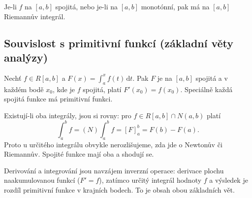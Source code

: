 \documentclass[11pt,a4paper]{article}
\begin{document}
\begin{center}
\end{center}

\begin{veta}
Je-li $f$ na $[a,b]$ spojitá, nebo je-li na $[a,b]$ monotónní, pak má na $[a,b]$ Riemannův integrál.
\end{veta}

\subsection{Souvislost s primitivní funkcí (základní věty analýzy)}

\begin{veta}
Nechť $f\in R[a,b]$ a $F(x)=\int_a^x f(t)\,\mathrm{d}t$. Pak $F$ je na $[a,b]$ spojitá a v každém bodě $x_0$, kde je $f$ spojitá, platí $F'(x_0)=f(x_0)$. Speciálně každá spojitá funkce má primitivní funkci.
\end{veta}

\begin{veta}
Existují-li oba integrály, jsou si rovny: pro $f\in R[a,b]\cap N(a,b)$ platí
\[
  \int_a^b f=(N)\!\int_a^b f=[F]_a^b=F(b)-F(a).
\]
Proto u určitého integrálu obvykle nerozlišujeme, zda jde o Newtonův či Riemannův. Spojité funkce mají oba a shodují se.
\end{veta}

\begin{intuice}
Derivování a integrování jsou navzájem inverzní operace: derivace  plochu naakumulovanou funkcí ($F'=f$), zatímco určitý integrál  hodnoty $f$ a výsledek je rozdíl primitivní funkce v krajních bodech. To je obsah obou základních vět.
\end{intuice}
\end{document}
